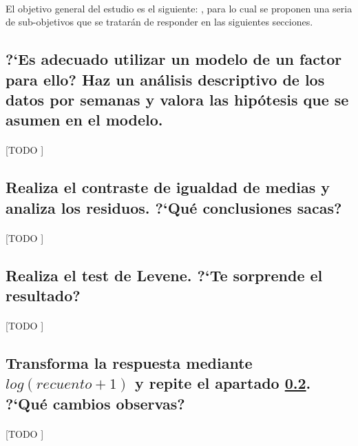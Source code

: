 \documentclass[11pt]{article}
\begin{document}
    \paragraph{}
    El objetivo general del estudio es el siguiente: \textbf{}, para lo cual se proponen una seria de sub-objetivos que se tratarán de responder en las siguientes secciones.

    \subsection{?`Es adecuado utilizar un modelo de un factor para ello? Haz un análisis descriptivo de los datos por semanas y valora las hipótesis que se asumen en el modelo.}
    \label{sec:e1}

      \paragraph{}
      [TODO ]


    \subsection{Realiza el contraste de igualdad de medias y analiza los residuos. ?`Qué conclusiones sacas?}
    \label{sec:e2}

      \paragraph{}
      [TODO ]


    \subsection{Realiza el test de Levene. ?`Te sorprende el resultado?}
    \label{sec:e3}

      \paragraph{}
      [TODO ]


    \subsection{Transforma la respuesta mediante $log(recuento + 1)$ y repite el apartado \ref{sec:e2}. ?`Qué cambios observas?}
    \label{sec:e4}

      \paragraph{}
      [TODO ]
\end{document}
